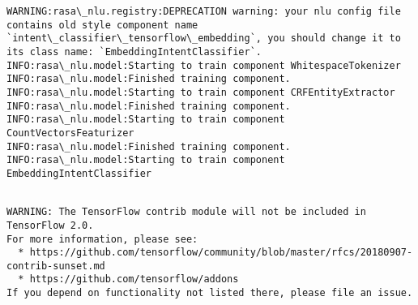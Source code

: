 \documentclass[11pt]{article}
\begin{document}
\begin{Verbatim}[commandchars=\\\{\}]
WARNING:rasa\_nlu.registry:DEPRECATION warning: your nlu config file contains old style component name `intent\_classifier\_tensorflow\_embedding`, you should change it to its class name: `EmbeddingIntentClassifier`.
INFO:rasa\_nlu.model:Starting to train component WhitespaceTokenizer
INFO:rasa\_nlu.model:Finished training component.
INFO:rasa\_nlu.model:Starting to train component CRFEntityExtractor
INFO:rasa\_nlu.model:Finished training component.
INFO:rasa\_nlu.model:Starting to train component CountVectorsFeaturizer
INFO:rasa\_nlu.model:Finished training component.
INFO:rasa\_nlu.model:Starting to train component EmbeddingIntentClassifier

    \end{Verbatim}

    \begin{Verbatim}[commandchars=\\\{\}]

WARNING: The TensorFlow contrib module will not be included in TensorFlow 2.0.
For more information, please see:
  * https://github.com/tensorflow/community/blob/master/rfcs/20180907-contrib-sunset.md
  * https://github.com/tensorflow/addons
If you depend on functionality not listed there, please file an issue.


    \end{Verbatim}
\end{document}
